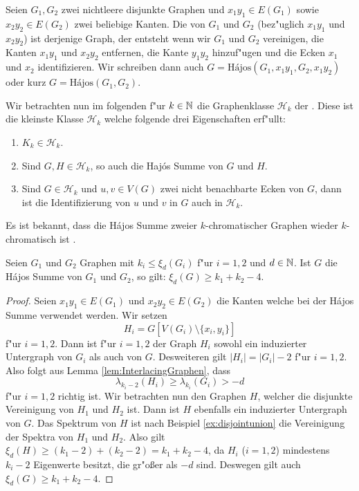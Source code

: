   Seien $G_1, G_2$ zwei nichtleere disjunkte Graphen und $x_1y_1\in E(G_1)$ sowie $x_2y_2 \in E(G_2)$ zwei beliebige Kanten. Die  \cite{Hajos61} von $G_1$ und $G_2$ (bez"uglich $x_1y_1$ und $x_2y_2$) ist derjenige Graph, der entsteht wenn wir $G_1$ und $G_2$ vereinigen, die Kanten $x_1y_1$ und $x_2y_2$ entfernen, die Kante $y_1y_2$ hinzuf"ugen und  die Ecken $x_1$ und $x_2$ identifizieren. Wir schreiben dann auch $G= \text{H\'ajos}(G_1,x_1y_1,G_2,x_1y_2)$ oder
  kurz $G= \text{H\'ajos}(G_1,G_2)$.

  Wir betrachten nun im folgenden f"ur $k\in {\mathbb{N}}$ die Graphenklasse $\mathcal{H}_k$ der . Diese ist die kleinste Klasse $\mathcal{H}_k$ welche folgende drei Eigenschaften erf"ullt:
  \begin{enumerate}
    \item $K_k\in \mathcal{H}_k$.
    \item Sind $G, H \in \mathcal{H}_k$, so auch die Haj\'os Summe von $G$ und $H$.
    \item Sind $G\in \mathcal{H}_k$ und $u,v\in V(G)$ zwei nicht benachbarte Ecken von $G$, dann ist die Identifizierung von $u$ und $v$ in $G$ auch in $\mathcal{H}_k$.
  \end{enumerate}

  Es ist bekannt, dass die H\'ajos Summe zweier $k$-chromatischer Graphen wieder $k$-chromatisch ist . 

  \begin{theorem}
    Seien $G_1$ und $G_2$ Graphen mit $k_i\leq \xi_{d}(G_i)$ f"ur $i=1,2$ und $d\in{\mathbb{N}}$. 
    Ist $G$ die H\'ajos Summe von $G_1$ und $G_2$, so gilt:
    $\xi_{d}(G) \geq k_1+k_2-4$.
    \label{thm:hajoseigenwerte}
  \end{theorem}

  \begin{proof}
    Seien $x_1y_1\in E(G_1)$ und $x_2y_2\in E(G_2)$ die Kanten welche bei der H\'ajos Summe verwendet werden. Wir setzen $$H_i = G[V(G_i)\setminus\{x_i,y_i\}] $$ f"ur $i=1,2$. Dann ist f"ur $i=1,2$ der Graph $H_i$ sowohl ein induzierter Untergraph von $G_i$ als auch von $G$. 
    Desweiteren gilt $|H_i| = |G_i|-2$ f"ur $i=1,2$. Also folgt aus Lemma \ref{lem:InterlacingGraphen}, dass $$\lambda_{k_i-2}(H_i) \geq \lambda_{k_i}(G_i) > -d$$ f"ur $i=1,2$ richtig ist. Wir betrachten nun den Graphen $H$, welcher die disjunkte Vereinigung von $H_1$ und $H_2$ ist. Dann ist $H$ ebenfalls ein induzierter Untergraph von $G$. 
    Das Spektrum von $H$ ist nach Beispiel \ref{ex:disjointunion} die Vereinigung der Spektra von $H_1$ und $H_2$. Also gilt $\xi_{d}(H) \geq (k_1-2)+ (k_2-2) = k_1+k_2-4$, da $H_i$ ($i=1,2$) mindestens $k_i -2$ Eigenwerte besitzt, die gr"o{\ss}er als $-d$ sind.
    Deswegen gilt auch $\xi_{d}(G) \geq k_1+k_2-4$.
  \end{proof}

